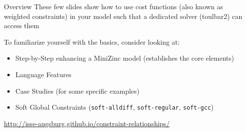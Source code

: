 \documentclass[handout,10pt,xcolor={dvipsnames},fleqn]{beamer}
\newcommand{\cemph}[1]{\alert{#1}}
\begin{document}
%
%
%
%

\begin{frame}{Overview}
These few slides show how to use cost functions (also known as weighted constraints) in your model
such that a dedicated solver (\alert{toulbar2}) can access them


\vspace*{2ex}

To familiarize yourself with the basics, consider looking at:
\begin{itemize}
\item Step-by-Step enhancing a MiniZinc model (establishes the core elements)
\item Language Features 
\item Case Studies (for some specific examples)
\item Soft Global Constraints (\texttt{soft-alldiff}, \texttt{soft-regular}, \texttt{soft-gcc})
\end{itemize}

\vspace*{2ex}

\url{http://isse-augsburg.github.io/constraint-relationships/}
\end{frame}
\end{document}
